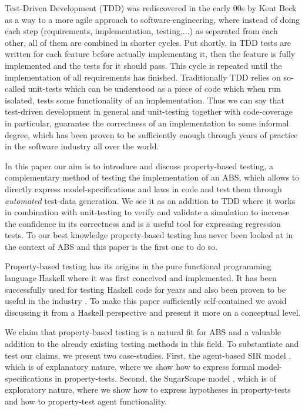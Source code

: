 Test-Driven Development (TDD) was rediscovered in the early 00s by Kent Beck \cite{beck_test_2002} as a way to a more agile approach to software-engineering, where instead of doing each step (requirements, implementation, testing,...) as separated from each other, all of them are combined in shorter cycles. Put shortly, in TDD tests are written for each feature before actually implementing it, then the feature is fully implemented and the tests for it should pass. This cycle is repeated until the implementation of all requirements has finished. Traditionally TDD relies on so-called unit-tests which can be understood as a piece of code which when run isolated, tests some functionality of an implementation. Thus we can say that test-driven development in general and unit-testing together with code-coverage in particular, guarantee the correctness of an implementation to some informal degree, which has been proven to be sufficiently enough through years of practice in the software industry all over the world. 

In this paper our aim is to introduce and discuss property-based testing, a complementary method of testing the implementation of an ABS, which allows to directly express model-specifications and laws in code and test them through \textit{automated} test-data generation. We see it as an addition to TDD where it works in combination with unit-testing to verify and validate a simulation to increase the confidence in its correctness and is a useful tool for expressing regression tests. To our best knowledge property-based testing has never been looked at in the context of ABS and this paper is the first one to do so.

Property-based testing has its origins \cite{claessen_quickcheck_2000,claessen_testing_2002,runciman_smallcheck_2008} in the pure functional programming language Haskell  where it was first conceived and implemented. It has been successfully used for testing Haskell code for years and also been proven to be useful in the industry \cite{hughes_quickcheck_2007}. To make this paper sufficiently self-contained we avoid discussing it from a Haskell perspective and present it more on a conceptual level. 

We claim that property-based testing is a natural fit for ABS and a valuable addition to the already existing testing methods in this field. To substantiate and test our claims, we present two case-studies. First, the agent-based SIR model \cite{macal_agent-based_2010}, which is of explanatory nature, where we show how to express formal model-specifications in property-tests. Second, the SugarScape model \cite{epstein_growing_1996}, which is of exploratory nature, where we show how to express hypotheses in property-tests and how to property-test agent functionality.

